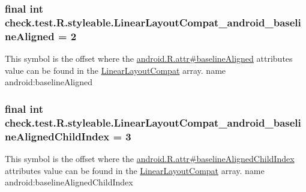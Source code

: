 \subsubsection[{Linear\+Layout\+Compat\+\_\+android\+\_\+baseline\+Aligned}]{\setlength{\rightskip}{0pt plus 5cm}final int check.\+test.\+R.\+styleable.\+Linear\+Layout\+Compat\+\_\+android\+\_\+baseline\+Aligned = 2\hspace{0.3cm}{\ttfamily [static]}}\label{classcheck_1_1test_1_1_r_1_1styleable_a67d8b5abe1097b46cea7bee93c465465}
This symbol is the offset where the \hyperlink{}{android.\+R.\+attr\#baseline\+Aligned} attribute\textquotesingle{}s value can be found in the \hyperlink{classcheck_1_1test_1_1_r_1_1styleable_a1cee5a37a541e5cb360983f35ebfe0fc}{Linear\+Layout\+Compat} array.  name android\+:baseline\+Aligned \hypertarget{classcheck_1_1test_1_1_r_1_1styleable_a856d64f5e68d12a9b3a5daaacfa57e7b}{}
\subsubsection[{Linear\+Layout\+Compat\+\_\+android\+\_\+baseline\+Aligned\+Child\+Index}]{\setlength{\rightskip}{0pt plus 5cm}final int check.\+test.\+R.\+styleable.\+Linear\+Layout\+Compat\+\_\+android\+\_\+baseline\+Aligned\+Child\+Index = 3\hspace{0.3cm}{\ttfamily [static]}}\label{classcheck_1_1test_1_1_r_1_1styleable_a856d64f5e68d12a9b3a5daaacfa57e7b}
This symbol is the offset where the \hyperlink{}{android.\+R.\+attr\#baseline\+Aligned\+Child\+Index} attribute\textquotesingle{}s value can be found in the \hyperlink{classcheck_1_1test_1_1_r_1_1styleable_a1cee5a37a541e5cb360983f35ebfe0fc}{Linear\+Layout\+Compat} array.  name android\+:baseline\+Aligned\+Child\+Index \hypertarget{classcheck_1_1test_1_1_r_1_1styleable_abe8ac977e2400616ce150828d8ec6a26}{}
